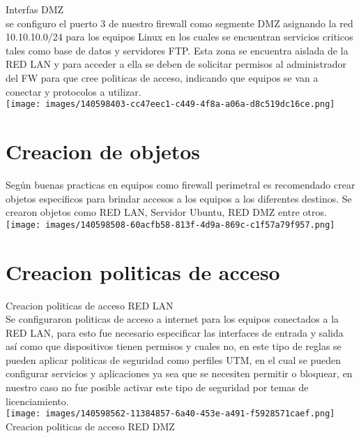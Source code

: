 \documentclass[10pt,a4paper]{article}
\begin{document}
Interfas DMZ\\

se configuro el puerto 3 de nuestro firewall como segmente DMZ asignando la red 10.10.10.0/24 para los equipos Linux en los cuales se encuentran servicios criticos tales como base de datos y servidores FTP. Esta zona se encuentra aislada de la RED LAN y para acceder a ella se deben de solicitar permisos al administrador del FW para que cree politicas de acceso, indicando que equipos se van a conectar y protocolos a utilizar.\\


\texttt{[image: images/140598403-cc47eec1-c449-4f8a-a06a-d8c519dc16ce.png]}


\section*{
Creacion de objetos}

Según buenas practicas en equipos como firewall perimetral es recomendado crear objetos especificos para brindar accesos a los equipos a los diferentes destinos. Se crearon objetos como RED LAN, Servidor Ubuntu, RED DMZ entre otros.\\

\texttt{[image: images/140598508-60acfb58-813f-4d9a-869c-c1f57a79f957.png]}


\section*{Creacion politicas de acceso
}

Creacion politicas de acceso RED LAN\\

Se configuraron politicas de acceso a internet para los equipos conectados a la RED LAN, para esto fue necesario especificar las interfaces de entrada y salida así como que dispositivos tienen permisos y cuales no, en este tipo de reglas se pueden aplicar politicas de seguridad como perfiles UTM, en el cual se pueden configurar servicios y aplicaciones ya sea que se necesiten permitir o bloquear, en nuestro caso no fue posible activar este tipo de seguridad por temas de licenciamiento.\\


\texttt{[image: images/140598562-11384857-6a40-453e-a491-f5928571caef.png]}\\

Creacion politicas de acceso RED DMZ\\
\end{document}

